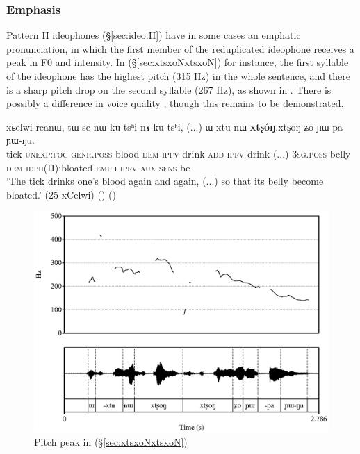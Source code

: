 \subsubsection{Emphasis} \label{sec:emphatic.idph}
Pattern II ideophones (§\ref{sec:ideo.II}) have in some cases an emphatic pronunciation, in which the first member of the reduplicated ideophone receives a peak in F0 and intensity. In (§\ref{sec:xtsxoNxtsxoN}) for instance, the first syllable of the ideophone  has the highest pitch (315 Hz) in the whole sentence, and there is a sharp pitch drop on the second syllable (267 Hz), as shown in . There is possibly a difference in voice quality \citep{japhug14ideophones}, though this remains to be demonstrated.


\begin{exe}
\ex \label{sec:xtsxoNxtsxoN}
\gll xɕelwi rcanɯ, tɯ-se nɯ ku-tsʰi nɤ ku-tsʰi, (...) ɯ-xtu nɯ \textbf{xtʂóŋ}.xtʂoŋ ʑo ɲɯ-pa ɲɯ-ŋu. \\
tick \textsc{unexp}:\textsc{foc} \textsc{genr}.\textsc{poss}-blood \textsc{dem} \textsc{ipfv}-drink \textsc{add} \textsc{ipfv}-drink (...) \textsc{3sg}.\textsc{poss}-belly \textsc{dem} \textsc{idph}(II):bloated \textsc{emph} \textsc{ipfv}-\textsc{aux} \textsc{sens}-be \\
\glt `The tick drinks one's blood again and again, (...) so that its belly become bloated.' (25-xCelwi) ()
()
\end{exe}


\begin{figure}
\caption{Pitch peak in (§\ref{sec:xtsxoNxtsxoN})} \label{fig:xtsxoN}
\includegraphics[width=\textwidth]{xtsxoN.eps}
\end{figure}

